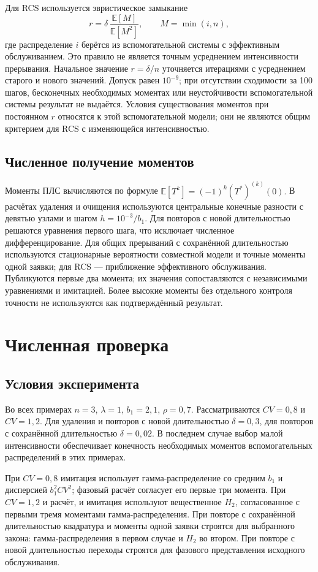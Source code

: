 \documentclass[a4paper,12pt]{article}
\begin{document}
Для RCS используется эвристическое замыкание
\[
r=\delta\,\frac{\mathbb E[M]}{\mathbb E[M^2]},\qquad M=\min(i,n),
\]
где распределение \(i\) берётся из вспомогательной системы с эффективным обслуживанием. Это правило не является точным усреднением интенсивности прерывания. Начальное значение \(r=\delta/n\) уточняется итерациями с усреднением старого и нового значений. Допуск равен \(10^{-9}\); при отсутствии сходимости за 100 шагов, бесконечных необходимых моментах или неустойчивости вспомогательной системы результат не выдаётся. Условия существования моментов при постоянном \(r\) относятся к этой вспомогательной модели; они не являются общим критерием для RCS с изменяющейся интенсивностью.

\subsection{Численное получение моментов}
Моменты ПЛС вычисляются по формуле \(\mathbb E[T^k]=(-1)^k(T^*)^{(k)}(0).\) В расчётах удаления и очищения используются центральные конечные разности с девятью узлами и шагом \(h=10^{-3}/b_1.\) Для повторов с новой длительностью решаются уравнения первого шага, что исключает численное дифференцирование. Для общих прерываний с сохранённой длительностью используются стационарные вероятности совместной модели и точные моменты одной заявки; для RCS --- приближение эффективного обслуживания. Публикуются первые два момента; их значения сопоставляются с независимыми уравнениями и имитацией. Более высокие моменты без отдельного контроля точности не используются как подтверждённый результат.

\section{Численная проверка}\label{sec:results}
\subsection{Условия эксперимента}
Во всех примерах \(n=3\), \(\lambda=1\), \(b_1=2{,}1\), \(\rho=0{,}7.\) Рассматриваются \(CV=0{,}8\) и \(CV=1{,}2.\) Для удаления и повторов с новой длительностью \(\delta=0{,}3\), для повторов с сохранённой длительностью \(\delta=0{,}02.\) В последнем случае выбор малой интенсивности обеспечивает конечность необходимых моментов вспомогательных распределений в этих примерах.

При \(CV=0{,}8\) имитация использует гамма-распределение со средним \(b_1\) и дисперсией \(b_1^2CV^2\); фазовый расчёт согласует его первые три момента. При \(CV=1{,}2\) и расчёт, и имитация используют вещественное \(H_2\), согласованное с первыми тремя моментами гамма-распределения. При повторе с сохранённой длительностью квадратура и моменты одной заявки строятся для выбранного закона: гамма-распределения в первом случае и \(H_2\) во втором. При повторе с новой длительностью переходы строятся для фазового представления исходного обслуживания.
\end{document}

